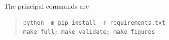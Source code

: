 The principal commands are
\begin{quote}
\texttt{python -m pip install -r requirements.txt}\\
\texttt{make full; make validate; make figures}\\
\end{quote}
